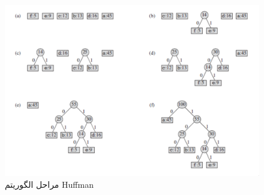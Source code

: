 \begin{figure}[]
        \centering
        \includegraphics[width=\textwidth]{figs/huffamn_tree.png}
        \caption{مراحل الگوریتم Huffman}
        \label{huffman_tree}
\end{figure}

